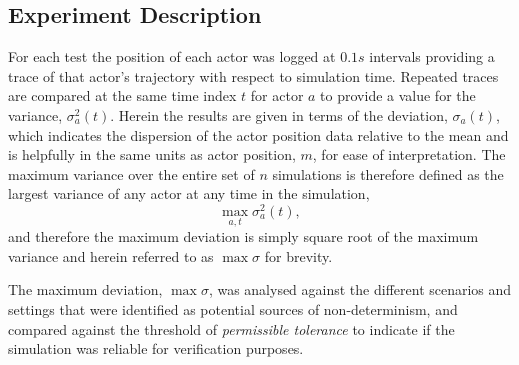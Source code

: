 \documentclass[letterpaper, 10 pt, journal, twoside]{IEEEtran}
\begin{document}
\subsection{Experiment Description}\label{s:Experiment_Description}
For each test the position of each actor was logged at $0.1s$ intervals providing a trace of that actor's trajectory with respect to simulation time. 
%
Repeated traces are compared at the same time index $t$ for actor $a$ to provide a value for the variance, $\sigma_a^{2}(t)$. 
%
Herein the results are given in terms of the deviation, $\sigma_a(t)$, which indicates the dispersion of the actor position data relative to the mean and is helpfully in the same units as actor position, $m$, for ease of interpretation.
%
The maximum variance over the entire set of $n$ simulations is therefore defined as the largest variance of any actor at any time in the simulation, 
\begin{equation} \label{eq:max_sigma}
\max_{a,t}\sigma_a^{2}(t), 
\end{equation}
and therefore the maximum deviation is simply square root of the maximum variance and herein referred to as ${\max\sigma}$ for brevity. 

The maximum deviation, $\max\sigma$, was analysed against the different scenarios and settings that were identified as potential sources of non-determinism, and compared against the threshold of \textit{permissible tolerance} to indicate if the simulation was reliable for verification purposes.
%
\end{document}
